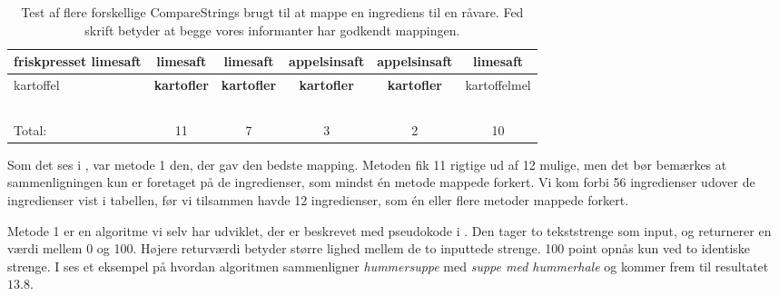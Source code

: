 \begin{table}
\begin{tabular}{|p{2cm}|c|c|c|c|c|}
        friskpresset limesaft                                      & \textbf{limesaft}        & \textbf{limesaft}                & appelsinsaft       & appelsinsaft       & \textbf{limesaft}        \\ \hline
        kartoffel                                                  & \textbf{kartofler}       & \textbf{kartofler}               & \textbf{kartofler}          & \textbf{kartofler}          & kartoffelmel    \\ \hline
        ~                                                          & ~               & ~                       & ~                  & ~                  & ~               \\ \hline
        Total:                                                     & 11              & 7                       & 3                  & 2                  & 10              \\
        \hline
    \end{tabular}
  \caption{Test af flere forskellige CompareStrings brugt til at mappe en ingrediens til en råvare. Fed skrift betyder at begge vores informanter har godkendt mappingen.}  \label{table:test-af-compares}
\end{table}

Som det ses i , var metode 1 den, der gav den bedste mapping. Metoden fik 11 rigtige ud af 12 mulige, men det bør bemærkes at sammenligningen kun er foretaget på de ingredienser, som mindst én metode mappede forkert. Vi kom forbi 56 ingredienser udover de ingredienser vist i tabellen, før vi tilsammen havde 12 ingredienser, som én eller flere metoder mappede forkert. 

Metode 1 er en algoritme vi selv har udviklet, der er beskrevet med pseudokode i . Den tager to tekststrenge som input, og returnerer en værdi mellem 0 og 100. Højere returværdi betyder større lighed mellem de to inputtede strenge. 100 point opnås kun ved to identiske strenge.
I  ses et eksempel på hvordan algoritmen sammenligner \textit{hummersuppe} med \textit{suppe med hummerhale} og kommer frem til resultatet $13.8$.

